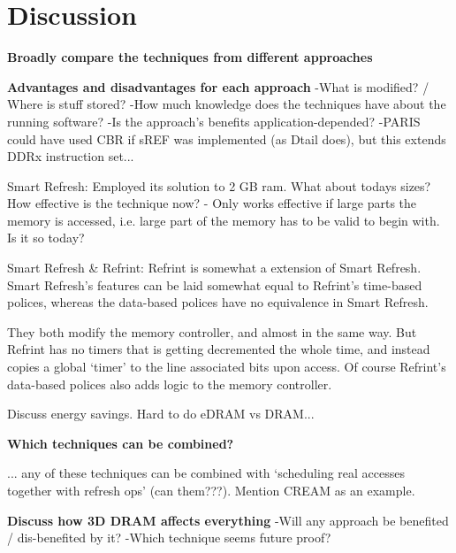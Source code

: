 \section{Discussion} 
\label{sec:disc}

\textbf{Broadly compare the techniques from different approaches}

\textbf{Advantages and disadvantages for each approach}
-What is modified? / Where is stuff stored?
-How much knowledge does the techniques have about the running software?
-Is the approach's benefits application-depended?
-PARIS could have used CBR if sREF was implemented (as Dtail does), but this extends DDRx instruction set...

Smart Refresh:
Employed its solution to 2 GB ram. What about todays sizes? How effective is the technique now? - Only works effective if large parts the memory is accessed, i.e. large part of the memory has to be valid to begin with. Is it so today?

Smart Refresh \& Refrint:
Refrint is somewhat a extension of Smart Refresh. Smart Refresh's features can be laid somewhat equal to Refrint's time-based polices, whereas the data-based polices have no equivalence in Smart Refresh.

They both modify the memory controller, and almost in the same way. But Refrint has no timers that is getting decremented the whole time, and instead copies a global `timer' to the line associated bits upon access. Of course Refrint's data-based polices also adds logic to the memory controller.

Discuss energy savings. Hard to do eDRAM vs DRAM...

\textbf{Which techniques can be combined?}

... any of these techniques can be combined with `scheduling real accesses together with refresh ops' (can them???). Mention CREAM as an example. 

\textbf{Discuss how 3D DRAM affects everything}
-Will any approach be benefited / dis-benefited by it? 
-Which technique seems future proof?